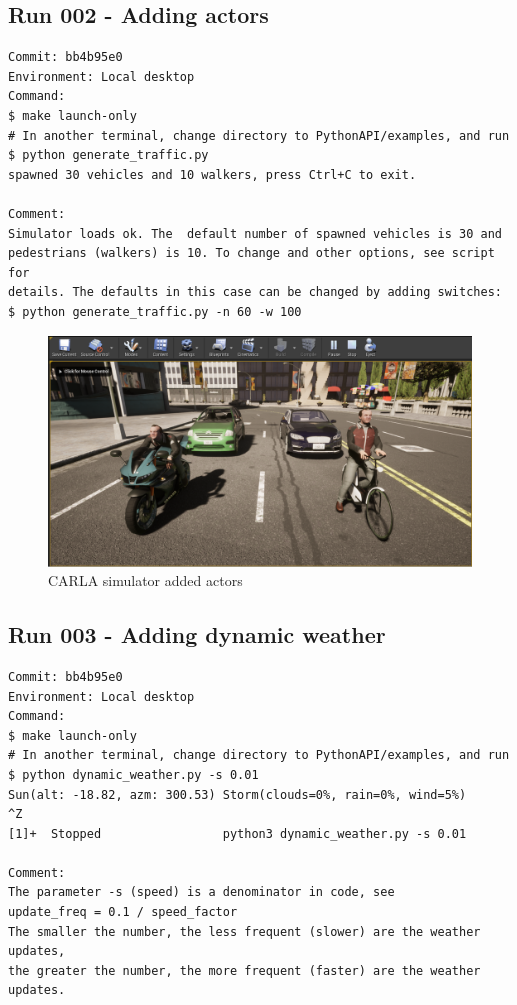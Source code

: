 \subsection{Run 002 - Adding actors}
\label{app_res:002}
\begin{verbatim}
Commit: bb4b95e0
Environment: Local desktop
Command:
$ make launch-only
# In another terminal, change directory to PythonAPI/examples, and run
$ python generate_traffic.py 
spawned 30 vehicles and 10 walkers, press Ctrl+C to exit.

Comment:
Simulator loads ok. The  default number of spawned vehicles is 30 and 
pedestrians (walkers) is 10. To change and other options, see script for 
details. The defaults in this case can be changed by adding switches:
$ python generate_traffic.py -n 60 -w 100
\end{verbatim}

\begin{figure}[h!]
\centering
\includegraphics[width=\textwidth]{Figures/biker-cyclist.png}
\caption{CARLA simulator added actors}
\label{fig:biker-cyclist}
\end{figure}


\subsection{Run 003 - Adding dynamic weather}
\label{app_res:003}
\begin{verbatim}
Commit: bb4b95e0
Environment: Local desktop
Command:
$ make launch-only
# In another terminal, change directory to PythonAPI/examples, and run
$ python dynamic_weather.py -s 0.01
Sun(alt: -18.82, azm: 300.53) Storm(clouds=0%, rain=0%, wind=5%)            ^Z
[1]+  Stopped                 python3 dynamic_weather.py -s 0.01

Comment:
The parameter -s (speed) is a denominator in code, see
update_freq = 0.1 / speed_factor
The smaller the number, the less frequent (slower) are the weather updates, 
the greater the number, the more frequent (faster) are the weather updates.
\end{verbatim}

